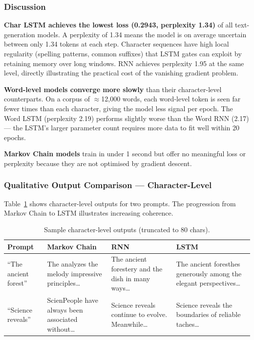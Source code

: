 \subsubsection*{Discussion}

\textbf{Char LSTM achieves the lowest loss (0.2943, perplexity 1.34)} of all
text-generation models. A perplexity of 1.34 means the model is on average
uncertain between only 1.34 tokens at each step. Character sequences have high
local regularity (spelling patterns, common suffixes) that LSTM gates can exploit
by retaining memory over long windows. RNN achieves perplexity 1.95 at the same
level, directly illustrating the practical cost of the vanishing gradient problem.

\textbf{Word-level models converge more slowly} than their character-level
counterparts. On a corpus of $\approx$12,000 words, each word-level token is seen
far fewer times than each character, giving the model less signal per epoch. The
Word LSTM (perplexity 2.19) performs slightly worse than the Word RNN (2.17) —
the LSTM's larger parameter count requires more data to fit well within 20 epochs.

\textbf{Markov Chain models} train in under 1 second but offer no meaningful loss
or perplexity because they are not optimised by gradient descent.

\subsubsection*{Qualitative Output Comparison — Character-Level}

Table~\ref{tab:task1_char_outputs} shows character-level outputs for two prompts.
The progression from Markov Chain to LSTM illustrates increasing coherence.

\begin{table}[H]
\centering
\caption{Sample character-level outputs (truncated to 80 chars).}
\label{tab:task1_char_outputs}
\renewcommand{\arraystretch}{1.3}
\begin{tabular}{p{3cm} p{3.5cm} p{3.5cm} p{3.5cm}}
\toprule
\textbf{Prompt} & \textbf{Markov Chain} & \textbf{RNN} & \textbf{LSTM} \\
\midrule
``The ancient forest'' &
The analyzes the melody impressive principles\ldots &
The ancient forestery and the dish in many ways\ldots &
The ancient foresthes generously among the elegant perspectives\ldots \\
\midrule
``Science reveals'' &
ScienPeople have always been associated without\ldots &
Science reveals continue to evolve. Meanwhile\ldots &
Science reveals the boundaries of reliable taches\ldots \\
\bottomrule
\end{tabular}
\end{table}

